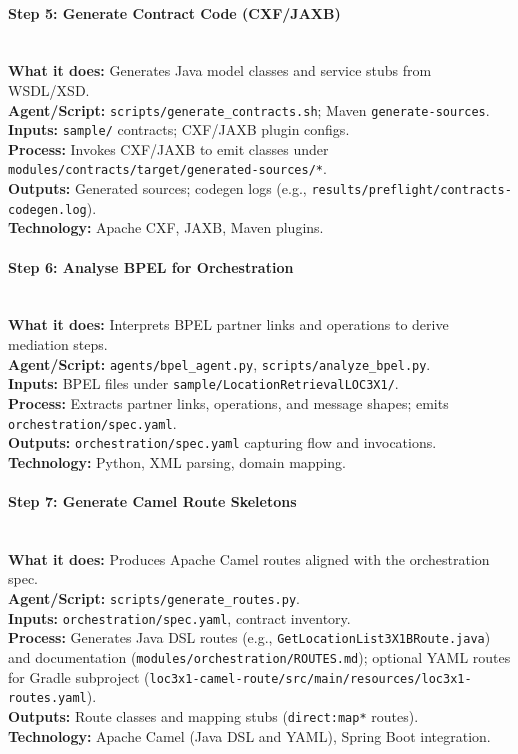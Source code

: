 \documentclass[11pt,a4paper]{article}
\begin{document}
\paragraph{Step 5: Generate Contract Code (CXF/JAXB)} \hfill\\
\textbf{What it does:} Generates Java model classes and service stubs from WSDL/XSD.\\
\textbf{Agent/Script:} \texttt{scripts/generate\_contracts.sh}; Maven \texttt{generate-sources}.\\
\textbf{Inputs:} \texttt{sample/} contracts; CXF/JAXB plugin configs.\\
\textbf{Process:} Invokes CXF/JAXB to emit classes under \texttt{modules/contracts/target/generated-sources/*}.\\
\textbf{Outputs:} Generated sources; codegen logs (e.g., \texttt{results/preflight/contracts-codegen.log}).\\
\textbf{Technology:} Apache CXF, JAXB, Maven plugins.

\paragraph{Step 6: Analyse BPEL for Orchestration} \hfill\\
\textbf{What it does:} Interprets BPEL partner links and operations to derive mediation steps.\\
\textbf{Agent/Script:} \texttt{agents/bpel\_agent.py}, \texttt{scripts/analyze\_bpel.py}.\\
\textbf{Inputs:} BPEL files under \texttt{sample/LocationRetrievalLOC3X1/}.\\
\textbf{Process:} Extracts partner links, operations, and message shapes; emits \texttt{orchestration/spec.yaml}.\\
\textbf{Outputs:} \texttt{orchestration/spec.yaml} capturing flow and invocations.\\
\textbf{Technology:} Python, XML parsing, domain mapping.

\paragraph{Step 7: Generate Camel Route Skeletons} \hfill\\
\textbf{What it does:} Produces Apache Camel routes aligned with the orchestration spec.\\
\textbf{Agent/Script:} \texttt{scripts/generate\_routes.py}.\\
\textbf{Inputs:} \texttt{orchestration/spec.yaml}, contract inventory.\\
\textbf{Process:} Generates Java DSL routes (e.g., \texttt{GetLocationList3X1BRoute.java}) and documentation (\texttt{modules/orchestration/ROUTES.md}); optional YAML routes for Gradle subproject (\texttt{loc3x1-camel-route/src/main/resources/loc3x1-routes.yaml}).\\
\textbf{Outputs:} Route classes and mapping stubs (\texttt{direct:map*} routes).\\
\textbf{Technology:} Apache Camel (Java DSL and YAML), Spring Boot integration.
\end{document}

